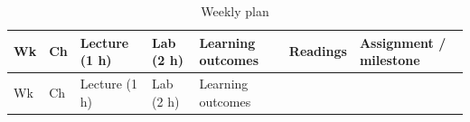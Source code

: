 \begin{longtable}[]{@{}
  >{\raggedright\arraybackslash}p{}
  >{\raggedright\arraybackslash}p{}
  >{\raggedright\arraybackslash}p{}
  >{\raggedright\arraybackslash}p{}
  >{\raggedright\arraybackslash}p{}
  >{\raggedright\arraybackslash}p{}
  >{\raggedright\arraybackslash}p{}@{}}
\caption{\centering Weekly plan}\tabularnewline
\toprule\noalign{}
\begin{minipage}[b]{\linewidth}\raggedright
Wk
\end{minipage} & \begin{minipage}[b]{\linewidth}\raggedright
Ch
\end{minipage} & \begin{minipage}[b]{\linewidth}\raggedright
Lecture (1 h)
\end{minipage} & \begin{minipage}[b]{\linewidth}\raggedright
Lab (2 h)
\end{minipage} & \begin{minipage}[b]{\linewidth}\raggedright
Learning outcomes
\end{minipage} & \begin{minipage}[b]{\linewidth}\raggedright
Readings
\end{minipage} & \begin{minipage}[b]{\linewidth}\raggedright
Assignment / milestone
\end{minipage} \\
\midrule\noalign{}
\endfirsthead
\toprule\noalign{}
\begin{minipage}[b]{\linewidth}\raggedright
Wk
\end{minipage} & \begin{minipage}[b]{\linewidth}\raggedright
Ch
\end{minipage} & \begin{minipage}[b]{\linewidth}\raggedright
Lecture (1 h)
\end{minipage} & \begin{minipage}[b]{\linewidth}\raggedright
Lab (2 h)
\end{minipage} & \begin{minipage}[b]{\linewidth}\raggedright
Learning outcomes
\end{minipage} & \begin{minipage}[b]{\linewidth}\raggedright

\end{minipage}
\end{longtable}
